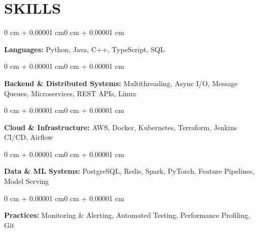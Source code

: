 \documentclass[9pt, letterpaper]{extarticle}
\newenvironment{onecolentry}{
    \begin{adjustwidth}{0 cm + 0.00001 cm}{0 cm + 0.00001 cm}
}{\end{adjustwidth}}
\begin{document}
    \section{SKILLS}
    \begin{onecolentry}
        \textbf{Languages:} Python, Java, C++, TypeScript, SQL
    \end{onecolentry}
    \vspace{0 cm}
    \begin{onecolentry}
        \textbf{Backend \& Distributed Systems:} Multithreading, Async I/O, Message Queues, Microservices, REST APIs, Linux
    \end{onecolentry}
    \vspace{0 cm}
    \begin{onecolentry}
        \textbf{Cloud \& Infrastructure:} AWS, Docker, Kubernetes, Terraform, Jenkins CI/CD, Airflow
    \end{onecolentry}
    \vspace{0 cm}
    \begin{onecolentry}
        \textbf{Data \& ML Systems:} PostgreSQL, Redis, Spark, PyTorch, Feature Pipelines, Model Serving
    \end{onecolentry}
    \vspace{0 cm}
    \begin{onecolentry}
        \textbf{Practices:} Monitoring \& Alerting, Automated Testing, Performance Profiling, Git
    \end{onecolentry}
\end{document}
